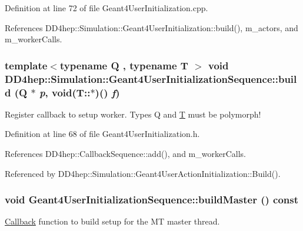 Definition at line 72 of file Geant4UserInitialization.cpp.

References DD4hep::Simulation::Geant4UserInitialization::build(), m\_\-actors, and m\_\-workerCalls.\hypertarget{class_d_d4hep_1_1_simulation_1_1_geant4_user_initialization_sequence_aa65113bb4e4f4b3d775dcdc9cc30b4b8}{
\subsubsection[{build}]{\setlength{\rightskip}{0pt plus 5cm}template$<$typename Q , typename T $>$ void DD4hep::Simulation::Geant4UserInitializationSequence::build (Q $\ast$ {\em p}, \/  void(T::$\ast$)() {\em f})}}
\label{class_d_d4hep_1_1_simulation_1_1_geant4_user_initialization_sequence_aa65113bb4e4f4b3d775dcdc9cc30b4b8}


Register callback to setup worker. Types Q and \hyperlink{class_t}{T} must be polymorph! 

Definition at line 68 of file Geant4UserInitialization.h.

References DD4hep::CallbackSequence::add(), and m\_\-workerCalls.

Referenced by DD4hep::Simulation::Geant4UserActionInitialization::Build().\hypertarget{class_d_d4hep_1_1_simulation_1_1_geant4_user_initialization_sequence_aec8d9a6016af25e06531351ba0f49418}{
\subsubsection[{buildMaster}]{\setlength{\rightskip}{0pt plus 5cm}void Geant4UserInitializationSequence::buildMaster () const}}
\label{class_d_d4hep_1_1_simulation_1_1_geant4_user_initialization_sequence_aec8d9a6016af25e06531351ba0f49418}


\hyperlink{class_d_d4hep_1_1_callback}{Callback} function to build setup for the MT master thread. 

